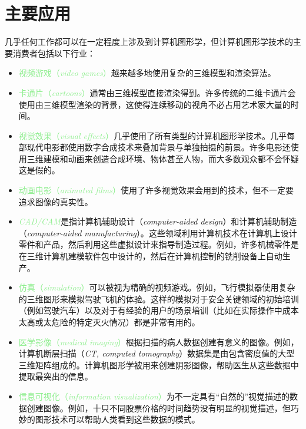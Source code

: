 \documentclass[lang=cn,12pt]{elegantbook}
\begin{document}
\section{主要应用}

几乎任何工作都可以在一定程度上涉及到计算机图形学，但计算机图形学技术的主要消费者包括以下行业：

\begin{itemize}
\item \textcolor{lightgreen}{视频游戏（\textit{video games}）}越来越多地使用复杂的三维模型和渲染算法。
\item \textcolor{lightgreen}{卡通片（\textit{cartoons}）}通常由三维模型直接渲染得到。许多传统的二维卡通片会使用由三维模型渲染的背景，这使得连续移动的视角不必占用艺术家大量的时间。
\item \textcolor{lightgreen}{视觉效果（\textit{visual effects}）}几乎使用了所有类型的计算机图形学技术。几乎每部现代电影都使用数字合成技术来叠加背景与单独拍摄的前景。许多电影还使用三维建模和动画来创造合成环境、物体甚至人物，而大多数观众都不会怀疑这是假的。
\item \textcolor{lightgreen}{动画电影（\textit{animated films}）}使用了许多视觉效果会用到的技术，但不一定要追求图像的真实性。
\item \textcolor{lightgreen}{\textit{CAD/CAM}}是指计算机辅助设计（\textit{computer-aided design}）和计算机辅助制造（\textit{computer-aided manufacturing}）。这些领域利用计算机技术在计算机上设计零件和产品，然后利用这些虚拟设计来指导制造过程。例如，许多机械零件是在三维计算机建模软件包中设计的，然后在计算机控制的铣削设备上自动生产。
\item \textcolor{lightgreen}{仿真（\textit{simulation}）}可以被视为精确的视频游戏。例如，飞行模拟器使用复杂的三维图形来模拟驾驶飞机的体验。这样的模拟对于安全关键领域的初始培训（例如驾驶汽车）以及对于有经验的用户的场景培训（比如在实际操作中成本太高或太危险的特定灭火情况）都是非常有用的。
\item \textcolor{lightgreen}{医学影像（\textit{medical imaging}）}根据扫描的病人数据创建有意义的图像。例如，计算机断层扫描（\textit{CT, computed tomography}）数据集是由包含密度值的大型三维矩阵组成的。计算机图形学被用来创建阴影图像，帮助医生从这些数据中提取最突出的信息。
\item \textcolor{lightgreen}{信息可视化（\textit{information visualization}）}为不一定具有“自然的”视觉描述的数据创建图像。例如，十只不同股票价格的时间趋势没有明显的视觉描述，但巧妙的图形技术可以帮助人类看到这些数据的模式。
\end{itemize}
\end{document}
